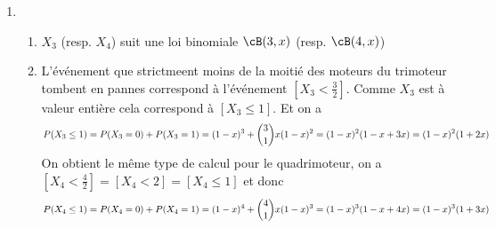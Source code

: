 \documentclass[a4paper, 11pt,reqno]{article}
\begin{document}
\begin{correction}
\begin{enumerate}
\item \begin{enumerate}
\item $X_3$ (resp. $X_4$) suit une loi binomiale $\cB(3,x)$ (resp. $\cB(4,x)$)
\item L'événement que strictmeent moins de la moitié des moteurs du trimoteur tombent en pannes correspond à l'événement $[X_3 <\frac{3}{2}]$. Comme $X_3$ est à valeur entière cela correspond à $[X_3\leq 1]$. Et on a 
$$P(X_3\leq 1 ) =P(X_3=0)+P(X_3=1) =\\ (1-x)^3 +\binom{3}{1} x (1-x)^2 = (1-x)^2 (1-x + 3x) = (1-x)^2(1+2x)$$
On obtient le même type de calcul pour le quadrimoteur, on a $[X_4 <\frac{4}{2}]= [X_4<2]=[X_4\leq 1]$ et donc 
$$P(X_4 \leq 1 ) =P(X_4=0)+P(X_4=1) =\\ (1-x)^4 +\binom{4}{1} x (1-x)^3 = (1-x)^3 (1-x + 4x) = (1-x)^3(1+3x)$$



\end{enumerate}
\end{enumerate}
\end{correction}
\end{document}
